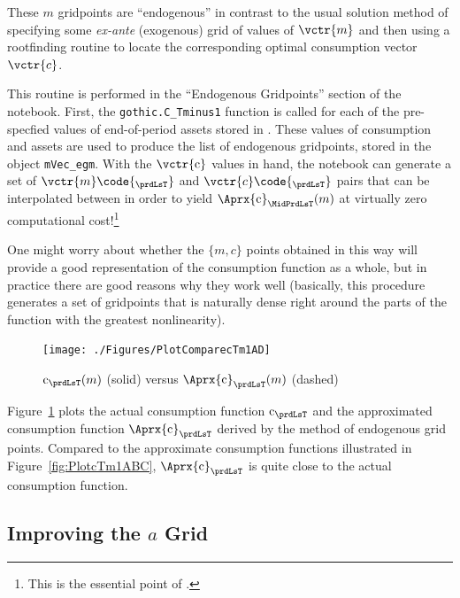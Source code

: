 \documentclass[titlepage, headings=optiontotocandhead]{econtex}
\begin{document}
These $m$ gridpoints are ``endogenous'' in contrast to the usual solution method of specifying some \textit{ex-ante} (exogenous) grid of values of $\vctr{m}$ and then using a rootfinding routine to locate the corresponding optimal consumption vector $\vctr{c}$.

This routine is performed in the ``Endogenous Gridpoints'' section of the notebook. First, the \texttt{gothic.C\_Tminus1} function is called for each of the pre-specfied values of end-of-period assets stored in . These values of consumption and assets are used to produce the list of endogenous gridpoints, stored in the object \texttt{mVec\_egm}. With the $\vctr{\mathrm{c}}$ values in hand, the notebook can generate a set of $\vctr{m}\code{_{\prdLsT}}$ and ${\vctr{c}\code{_{\prdLsT}}}$ pairs that can be interpolated between in order to yield $\Aprx{\mathrm{c}}_{\MidPrdLsT}(m)$ at virtually zero computational cost!\footnote{This is the essential point of \cite{carrollEGM}.} %

\hypertarget{PlotComparecTm1AD}{}
One might worry about whether the $\{{m},c\}$ points obtained in this way will provide a good representation of the consumption function as a whole, but in practice there are good reasons why they work well (basically, this procedure generates a set of gridpoints that is naturally dense right around the parts of the function with the greatest nonlinearity).
\begin{figure}
  \centerline{\texttt{[image: ./Figures/PlotComparecTm1AD]}}
  \caption{$\mathrm{c}_{\prdLsT}(m)$ (solid) versus $\Aprx{\mathrm{c}}_{\prdLsT}(m)$ (dashed)}
  \label{fig:ComparecTm1AD}
\end{figure}
Figure~\ref{fig:ComparecTm1AD} plots the actual consumption function $\mathrm{c}_{\prdLsT}$ and the approximated consumption function $\Aprx{\mathrm{c}}_{\prdLsT}$ derived by the method of endogenous grid points. Compared to the approximate consumption functions illustrated in Figure~\ref{fig:PlotcTm1ABC}, $\Aprx{\mathrm{c}}_{\prdLsT}$ is quite close to the actual consumption function.

\hypertarget{improving-the-a-grid}{}
\subsection{Improving the $a$ Grid}\label{subsec:improving-the-a-grid}
\end{document}

